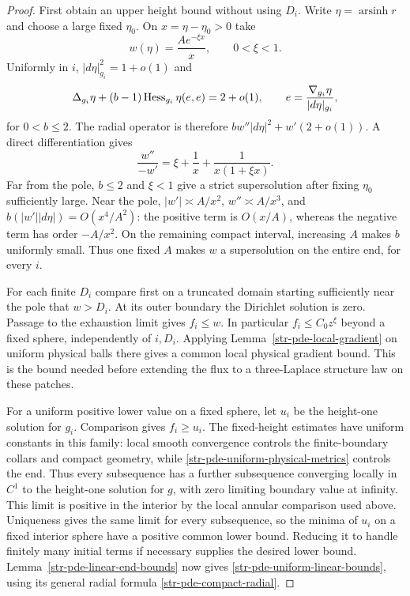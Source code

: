 \begin{proof}
First obtain an upper height bound without using $D_i$.
Write $\eta=\operatorname{arsinh}r$ and choose a large fixed
$\eta_0$. On $x=\eta-\eta_0>0$ take
\begin{equation}\label{str-pde-pole-barrier}
 w(\eta)=\frac{A e^{-\xi x}}x,\qquad 0<\xi<1.
\end{equation}
Uniformly in $i$, $|d\eta|_{g_i}^2=1+o(1)$ and
\[
 \Delta_{g_i}\eta+(b-1)\operatorname{Hess}_{g_i}\eta(e,e)=2+o(1),
 \qquad e=\frac{\nabla_{g_i}\eta}{|d\eta|_{g_i}},
\]
for $0<b\leq2$. The radial operator is therefore
$b w''|d\eta|^2+w'(2+o(1))$. A direct differentiation gives
\[
 \frac{w''}{-w'}=\xi+\frac1x+\frac1{x(1+\xi x)}.
\]
Far from the pole, $b\leq2$ and $\xi<1$ give a strict
supersolution after fixing $\eta_0$ sufficiently large.
Near the pole, $|w'|\asymp A/x^2$, $w''\asymp A/x^3$,
and $b(|w'||d\eta|)=O(x^4/A^2)$: the positive term is
$O(x/A)$, whereas the negative term has order $-A/x^2$.
On the remaining compact interval, increasing $A$ makes $b$
uniformly small. Thus one fixed $A$ makes $w$ a supersolution
on the entire end, for every $i$.

For each finite $D_i$ compare first on a truncated domain
starting sufficiently near the pole that $w>D_i$. At its
outer boundary the Dirichlet solution is zero. Passage to
the exhaustion limit gives $f_i\leq w$. In particular
$f_i\leq C_0z^\xi$ beyond a fixed sphere, independently of
$i,D_i$. Applying Lemma~\ref{str-pde-local-gradient} on
uniform physical balls there gives a common local physical
gradient bound. This is the bound needed before extending
the flux to a three-Laplace structure law on these patches.

For a uniform positive lower value on a fixed sphere, let
$u_i$ be the height-one solution for $g_i$. Comparison gives
$f_i\geq u_i$. The fixed-height estimates have uniform
constants in this family: local smooth convergence controls
the finite-boundary collars and compact geometry, while
\eqref{str-pde-uniform-physical-metrics} controls the end.
Thus every subsequence has a further subsequence converging
locally in $C^1$ to the height-one solution for $g$, with
zero limiting boundary value at infinity. This limit is
positive in the interior by the local annular comparison
used above. Uniqueness gives the same limit for every
subsequence, so the minima of $u_i$ on a fixed interior
sphere have a positive common lower bound. Reducing it to
handle finitely many initial terms if necessary supplies
the desired lower bound.
Lemma~\ref{str-pde-linear-end-bounds} now gives
\eqref{str-pde-uniform-linear-bounds}, using its general
radial formula \eqref{str-pde-compact-radial}.


\end{proof}
